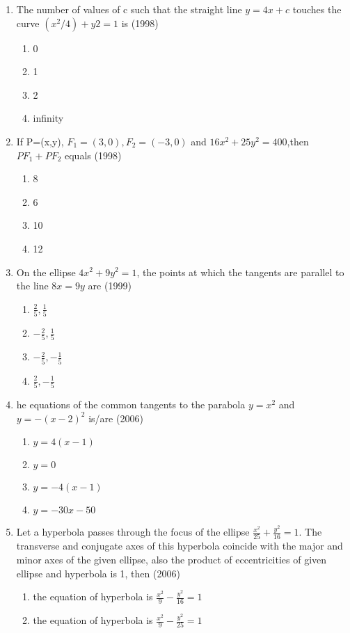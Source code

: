 \documentclass[12pt]{article}
\begin{document}
\begin{enumerate}
\item The number of values of c such that the straight line $y=4x+c$ touches the curve $(x^2/4)+y2=1$ is (1998)
\begin{enumerate}
\item 0
\item 1
\item 2
\item infinity
\end{enumerate}
\item If P=(x,y), $F_1=(3,0),F_2=(-3,0)$ and $16x^2+25y^2=400$,then $PF_1+PF_2$ equals (1998)
\begin{enumerate}
\item 8
\item 6
\item 10
\item 12
\end{enumerate}
\item On the ellipse $4x^2+9y^2=1$, the points at which the tangents are parallel to the line $8x=9y$ are (1999)
\begin{enumerate}
\item $\frac{2}{5},\frac{1}{5}$
\item $-\frac{2}{5},\frac{1}{5}$
\item $-\frac{2}{5},-\frac{1}{5}$
\item $\frac{2}{5},-\frac{1}{5}$
\end{enumerate}
\item he equations of the common tangents to the parabola $y=x^2$ and $y=-(x-2)^2$ is/are (2006)
\begin{enumerate}
\item $y=4(x-1)$
\item $y=0$
\item $y=-4(x-1)$
\item $y=-30x-50$
\end{enumerate}
\item Let a hyperbola passes through the focus of the ellipse $\frac{x^2}{25}+\frac{y^2}{16}=1$. The transverse and conjugate axes of this hyperbola coincide with the major and minor axes of the given ellipse, also the product of eccentricities of given ellipse and hyperbola is 1, then (2006)
\begin{enumerate}
\item  the equation of hyperbola is $\frac{x^2}{9}-\frac{y^2}{16}=1$
\item  the equation of hyperbola is $\frac{x^2}{9}-\frac{y^2}{25}=1$

\end{enumerate}
\end{enumerate}
\end{document}
